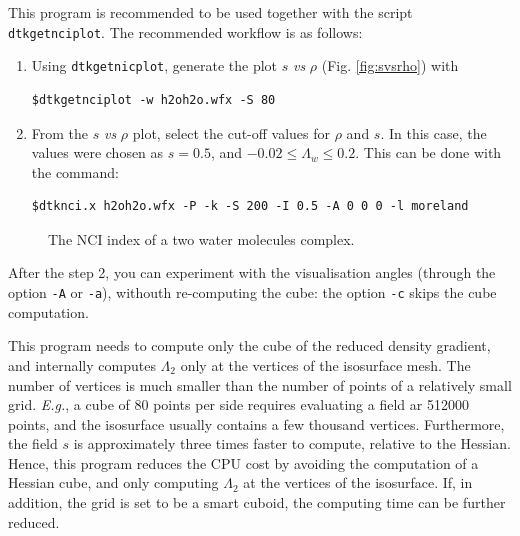 This program is recommended to be used together with the script \texttt{dtkgetnciplot}. The recommended workflow is as follows:
\begin{enumerate}
	\item Using \texttt{dtkgetnicplot}, generate the plot $s$ \textit{vs} $\rho$ (Fig. \ref{fig:svsrho}) with
	\begin{lstlisting}
$dtkgetnciplot -w h2oh2o.wfx -S 80
	\end{lstlisting}
	\item From the $s$ \textit{vs} $\rho$ plot, select the cut-off values for $\rho$ and $s$. In this case,
	the values were chosen as $s=0.5$, and  $-0.02\leq\Lambda_w\leq0.2$. This can be done with the command:
	\begin{lstlisting}
$dtknci.x h2oh2o.wfx -P -k -S 200 -I 0.5 -A 0 0 0 -l moreland
	\end{lstlisting}
\end{enumerate}
%
\begin{figure}[hb!]
\centering
{}\quad
{}
\caption{The NCI index of a two water molecules complex.}\label{fig:dtknci}
\end{figure}
%

After the step 2, you can experiment with the visualisation angles (through the option \texttt{-A}
or \texttt{-a}), withouth re-computing the cube: the option \texttt{-c} skips the cube computation.

This program needs to compute only the cube of the reduced density gradient, and internally computes
$\Lambda_2$ only at the vertices of the isosurface mesh. The number of vertices is much smaller
than the number of points of a relatively small grid. \textit{E.g.}, a cube of 80 points per side
requires evaluating a field ar 512000 points, and the isosurface usually contains a few thousand
vertices. Furthermore, the field $s$ is approximately three times faster to compute, relative to
the Hessian. Hence, this program reduces the CPU cost by avoiding the
computation of a Hessian cube, and only computing $\Lambda_2$ at the vertices of the isosurface.
If, in addition, the grid is set to be a \DTK{} smart cuboid, the computing time can be further reduced.

